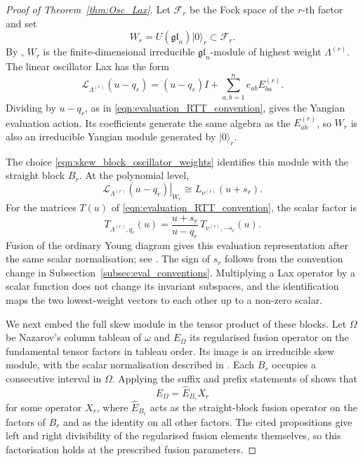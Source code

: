 \documentclass[12pt,reqno]{amsart}
\newcommand{\ket}[1]{{| #1 \rangle}}      %
\numberwithin{equation}{section}
\begin{document}
\begin{proof}[Proof of Theorem~\ref{thm:Osc_Lax}]
	Let $\mathcal F_r$ be the Fock space of the $r$-th factor and set
	\begin{equation*}
		W_r=U(\mathfrak{gl}_n)\ket0_r\subset\mathcal F_r.
	\end{equation*}
	By \cite[Corollary~3.17(b)]{FKT}, $W_r$ is the finite-dimensional
	irreducible $\mathfrak{gl}_n$-module of highest weight
	$\Lambda^{(r)}$. The linear oscillator Lax has the form
	\begin{equation*}
		\mathcal L_{\Lambda^{(r)}}(u-q_r)
		=(u-q_r)I+\sum_{a,b=1}^n e_{ab}E_{ba}^{(r)}.
	\end{equation*}
	Dividing by $u-q_r$, as in
	\eqref{eqn:evaluation_RTT_convention}, gives the Yangian
	evaluation action. Its coefficients generate the same algebra
	as the $E_{ab}^{(r)}$, so $W_r$ is also an irreducible Yangian
	module generated by $\ket0_r$.
	
	The choice \eqref{eqn:skew_block_oscillator_weights} identifies
	this module with the straight block $B_r$. At the polynomial
	level,
	\begin{equation*}
		\left.\mathcal L_{\Lambda^{(r)}}(u-q_r)\right|_{W_r}
		\cong L_{\nu^{(r)}}(u+s_r).
	\end{equation*}
	For the matrices $T(u)$ of
	\eqref{eqn:evaluation_RTT_convention}, the scalar factor is
	\begin{equation*}
		T_{\Lambda^{(r)},q_r}(u)
		=\frac{u+s_r}{u-q_r}\,
		T_{\nu^{(r)},-s_r}(u).
	\end{equation*}
	Fusion of the ordinary Young diagram gives this evaluation
	representation after the same scalar normalisation; see
	\cite[Sections~1.3--1.5]{Nazarov2002}. The sign of $s_r$ follows
	from the convention change in
	Subsection~\ref{subsec:eval_conventions}. Multiplying a Lax
	operator by a scalar function does not change its invariant
	subspaces, and the identification maps the two lowest-weight
	vectors to each other up to a non-zero scalar.
	
	We next embed the full skew module in the tensor product of these
	blocks. Let $\Omega$ be Nazarov's column tableau of $\omega$ and
	$E_\Omega$ its regularised fusion operator on the fundamental
	tensor factors in tableau order. Its image is an irreducible
	skew module, with the scalar normalisation described in
	\cite[Proposition~2 and Theorem~2]{Nazarov2002}.
	Each $B_r$ occupies a consecutive interval in $\Omega$.
	Applying the suffix and prefix statements of
	\cite[Propositions~2.6 and~2.7]{NTBlockFusion2002} shows that
	\begin{equation*}
		E_\Omega=\widehat E_{B_r}X_r
	\end{equation*}
	for some operator $X_r$, where $\widehat E_{B_r}$ acts as the
	straight-block fusion operator on the factors of $B_r$ and as
	the identity on all other factors. The cited propositions give
	left and right divisibility of the regularised fusion elements
	themselves, so this factorisation holds at the prescribed fusion
	parameters.
	

\end{proof}
\end{document}
